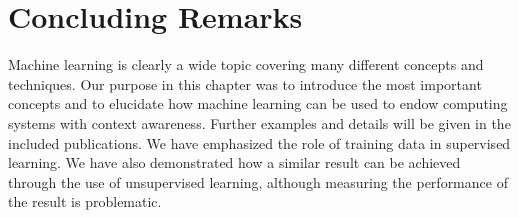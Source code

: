 %

\section{Concluding Remarks}
\label{sec:ml_concluding_remarks}

Machine learning is clearly a wide topic covering many different concepts and techniques. Our purpose in this chapter was to introduce the most important concepts and to elucidate how machine learning can be used to endow computing systems with context awareness. Further examples and details will be given in the included publications. We have emphasized the role of training data in supervised learning. We have also demonstrated how a similar result can be achieved through the use of unsupervised learning, although measuring the performance of the result is problematic.

%
